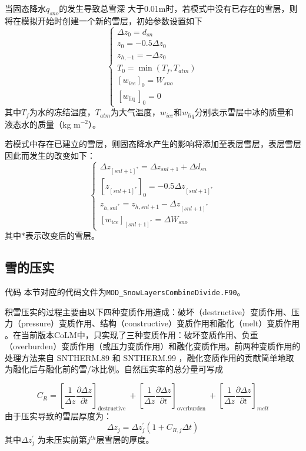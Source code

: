 当固态降水$q_{sno}$的发生导致总雪深 大于0.01m时，若模式中没有已存在的雪层，则将在模拟开始时创建一个新的雪层，初始参数设置如下
\begin{equation}
\left\{\begin{array}{c}\Delta z_{0}={d}_{{sn}} \\ z_{0}=-0.5 \Delta z_{0} \\ z_{{h},-1}=-\Delta z_{0} \\ T_{0}=\min \left(T_{{f}}, T_{{atm}}\right) \\ {\left[{w}_{{ice}}\right]_{0}={W}_{{sno}}} \\ {\left[{w}_{\text {liq }}\right]_{0}=0}\end{array}\right.
\end{equation}
其中$T_f$为水的冻结温度，$T_{atm}$为大气温度，$w_{ice}$和$w_{liq}$分别表示雪层中冰的质量和液态水的质量（kg m$^{-2}$）。


若模式中存在已建立的雪层，则固态降水产生的影响将添加至表层雪层，表层雪层因此而发生的改变如下：
\begin{equation}
\left\{\begin{array}{c}\Delta z_{[{snl}+1]^{*}}=\Delta z_{{snl}+1}+\Delta {d}_{{sn}} \\ {\left[z_{[{snl}+1]^{*}}\right]_{0}=-0.5 \Delta z_{[{snl}+1]^{*}}} \\ z_{{h}, {snl}^{*}}=z_{{h}, {snl}+1}-\Delta z_{[{snl}+1]^{*}} \\ {\left[{w}_{{ice}}\right]_{[{snl}+1]^{*}}=\Delta {W}_{{sno}}}\end{array}\right.
\end{equation}
其中$\ast$表示改变后的雪层。

\subsection{雪的压实}
\begin{mymdframed}{代码}
本节对应的代码文件为\texttt{MOD\_SnowLayersCombineDivide.F90}。
\end{mymdframed}
积雪压实的过程主要由以下四种变质作用造成：破坏（destructive）变质作用、压力（pressure）变质作用、结构（constructive）变质作用和融化（melt）变质作用 \citep{yen1981review}。在当前版本CoLM中，只实现了三种变质作用：破坏变质作用、负重（overburden）变质作用（或压力变质作用）和融化变质作用。前两种变质作用的处理方法来自 SNTHERM.89 \citep{jordan1991one}和 SNTHERM.99 \citep{jordan1999heat}，融化变质作用的贡献简单地取为融化后与融化前的雪/冰比例。自然压实率的总分量可写成

\begin{equation}
{C}_{{R}}=\left[\frac{1}{\Delta {z}} \frac{\partial \Delta {z}}{\partial {t}}\right]_{\text {destructive }}+\left[\frac{1}{\Delta {z}} \frac{\partial \Delta {z}}{\partial {t}}\right]_{\text {overburden }}+\left[\frac{1}{\Delta {z}} \frac{\partial \Delta {z}}{\partial {t}}\right]_{{melt}}
\end{equation}
由于压实导致的雪层厚度为：
\begin{equation}
\Delta z_{j}=\Delta z_{j}^{\prime}\left(1+C_{R, j} \Delta t\right)
\end{equation}
其中$\Delta {z}_{{j}}^{\prime}$ 为未压实前第$j^{th}$层雪层的厚度。



